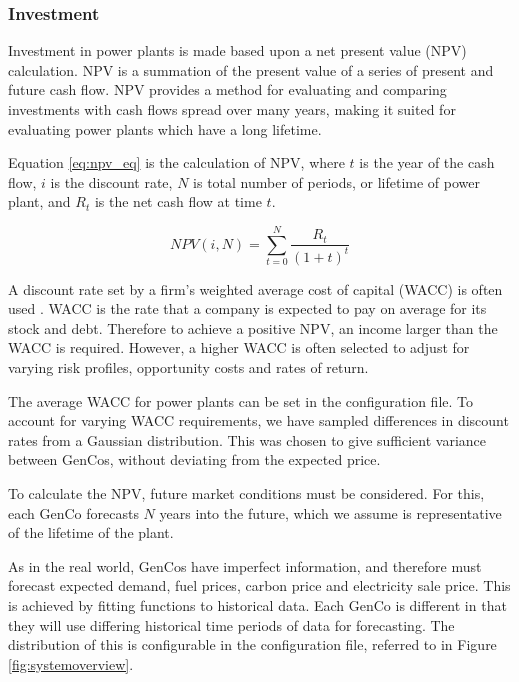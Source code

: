 \subsubsection{Investment}

Investment in power plants is made based upon a net present value (NPV) calculation. NPV is a summation of the present value of a series of present and future cash flow. NPV provides a method for evaluating and comparing investments with cash flows spread over many years, making it suited for evaluating power plants which have a long lifetime. %

Equation \ref{eq:npv_eq} is the calculation of NPV, where $t$ is the year of the cash flow, $i$ is the discount rate, $N$ is total number of periods, or lifetime of power plant, and $R_t$ is the net cash flow at time $t$.

\begin{equation} \label{eq:npv_eq}
NPV(i, N) = \sum_{t=0}^{N}\frac{R_t}{(1+t)^t}
\end{equation}

A discount rate set by a firm's weighted average cost of capital (WACC) is often used \cite{KincheloeStephenC1990TWAC}. WACC is the rate that a company is expected to pay on average for its stock and debt. Therefore to achieve a positive NPV, an income larger than the WACC is required. However, a higher WACC is often selected to adjust for varying risk profiles, opportunity costs and rates of return. 

The average WACC for power plants can be set in the configuration file. To account for varying WACC requirements, we have sampled differences in discount rates from a Gaussian distribution. This was chosen to give sufficient variance between GenCos, without deviating from the expected price.

To calculate the NPV, future market conditions must be considered. For this, each GenCo forecasts $N$ years into the future, which we assume is representative of the lifetime of the plant.

As in the real world, GenCos have imperfect information, and therefore must forecast expected demand, fuel prices, carbon price and electricity sale price. This is achieved by fitting functions to historical data. Each GenCo is different in that they will use differing historical time periods of data for forecasting. The distribution of this is configurable in the configuration file, referred to in Figure \ref{fig:systemoverview}.

